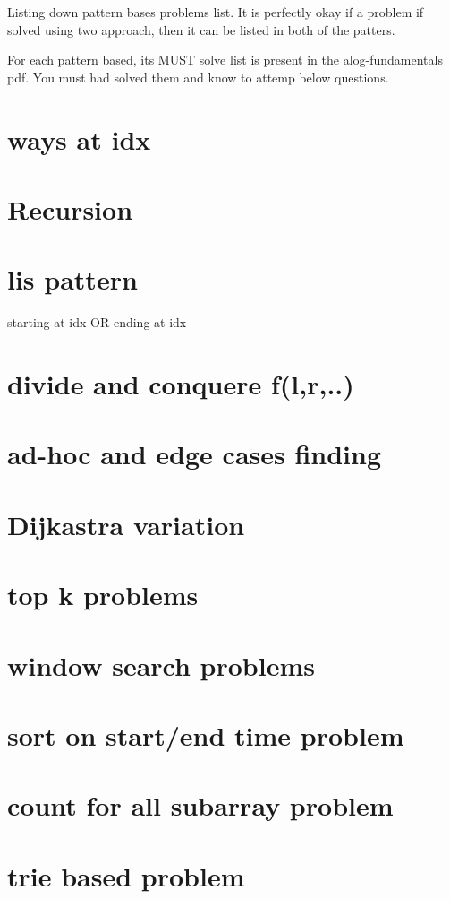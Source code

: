 
Listing down pattern bases problems list.
It is perfectly okay if a problem if solved using two approach, then it can be listed in both of the patters.

For each pattern based, its MUST solve list is present in the alog-fundamentals pdf. You must had solved them and know to attemp below questions.

\setcounter{chapter}{0}
\chapter{ways at idx}

\chapter{Recursion}
\chapter{lis pattern}
    starting at idx OR ending at idx
\chapter{divide and conquere f(l,r,..)}
\chapter{ad-hoc and edge cases finding}
\chapter{Dijkastra variation}
\chapter{top k problems}
\chapter{window search problems}
\chapter{sort on start/end time problem}
\chapter{count for all subarray problem}
\chapter{trie based problem}
